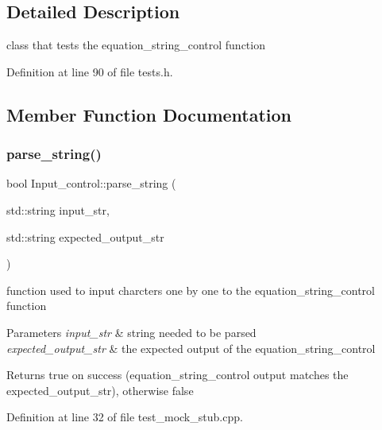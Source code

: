 \subsection{Detailed Description}
class that tests the equation\+\_\+string\+\_\+control function 

Definition at line 90 of file tests.\+h.



\subsection{Member Function Documentation}
\mbox{\label{class_input__control_a4961e9c94d7171f539fd1d59026cdf4e}} 
\subsubsection{\texorpdfstring{parse\_string()}{parse\_string()}}
{\footnotesize\ttfamily bool Input\+\_\+control\+::parse\+\_\+string (\begin{DoxyParamCaption}\item[{std\+::string}]{input\+\_\+str,  }\item[{std\+::string}]{expected\+\_\+output\+\_\+str }\end{DoxyParamCaption})\hspace{0.3cm}{\ttfamily [protected]}}



function used to input charcters one by one to the equation\+\_\+string\+\_\+control function 


\begin{DoxyParams}{Parameters}
{\em input\+\_\+str} & string needed to be parsed \\
\hline
{\em expected\+\_\+output\+\_\+str} & the expected output of the equation\+\_\+string\+\_\+control \\
\hline
\end{DoxyParams}
\begin{DoxyReturn}{Returns}
true on success (equation\+\_\+string\+\_\+control output matches the expected\+\_\+output\+\_\+str), otherwise false 
\end{DoxyReturn}


Definition at line 32 of file test\+\_\+mock\+\_\+stub.\+cpp.


